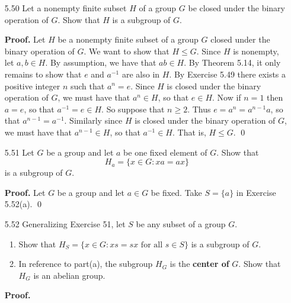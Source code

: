 \begin{enumerate}
      \textbf{Proof.} See Exercise 4.34. \qed
   \item[5.50] Let a nonempty finite subset $H$ of a group $G$ be closed under
               the binary operation of $G$. Show that $H$ is a subgroup of $G$.

      \textbf{Proof.} Let $H$ be a nonempty finite subset of a group $G$ closed 
      under the binary operation of $G$. We want to show that $H \le G$. Since
      $H$ is nonempty, let $a, b \in H$. By assumption, we have that $ab \in H$.
      By Theorem 5.14, it only remains to show  that $e$ and $a^{-1}$ are also 
      in $H$. By Exercise 5.49 there exists a positive integer $n$ such that
      $a^n = e$. Since $H$ is closed under the binary operation of $G$, we must
      have that $a^n \in H$, so that $e \in H$. Now if $n = 1$ then $a = e$, so
      that $a^{-1} = e \in H$. So suppose that $n \ge 2$. Thus
      $e = a^n = a^{n-1}a$, so that $a^{n-1} = a^{-1}$. Similarly since $H$ is 
      closed under the binary operation of $G$, we must have that
      $a^{n - 1} \in H$, so that $a^{-1} \in H$. That is, $H \le G$. \qed
   \item[5.51] Let $G$ be a group and let $a$ be one fixed element of $G$. Show
               that
               $$H_a = \{x \in G : xa = ax\}$$
               is a subgroup of $G$.

      \textbf{Proof.} Let $G$ be a group and let $a \in G$ be fixed. Take
      $S = \{a\}$ in Exercise 5.52(a). \qed
   \item[5.52] Generalizing Exercise 51, let $S$ be any subset of a group $G$.
               \begin{enumerate}
                  \item Show that
                        $H_S = \{x \in G : xs = sx \text{ for all } s \in S\}$
                        is a subgroup of $G$.
                  \item In reference to part(a), the subgroup $H_G$ is the
                        \textbf{center of} $G$. Show that $H_G$ is an abelian
                        group.
               \end{enumerate}

      \textbf{Proof.}


\end{enumerate}

